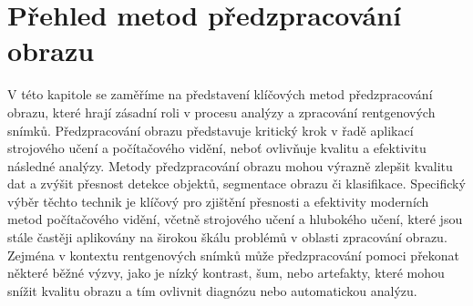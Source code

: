 \documentclass[male,czech,api_ing]{thesis}
\begin{document}
       
       
       
       
       
        
	
	


\chapter{Přehled metod předzpracování obrazu}
V této kapitole se zaměříme na představení klíčových metod předzpracování obrazu, které hrají zásadní roli v procesu analýzy a zpracování rentgenových snímků. Předzpracování obrazu představuje kritický krok v řadě aplikací strojového učení a počítačového vidění, neboť ovlivňuje kvalitu a efektivitu následné analýzy. Metody předzpracování obrazu mohou výrazně zlepšit kvalitu dat a zvýšit přesnost detekce objektů, segmentace obrazu či klasifikace. Specifický výběr těchto technik je klíčový pro zjištění přesnosti a efektivity moderních metod počítačového vidění, včetně strojového učení a hlubokého učení, které jsou stále častěji aplikovány na širokou škálu problémů v oblasti zpracování obrazu. Zejména v kontextu rentgenových snímků může předzpracování pomoci překonat některé běžné výzvy, jako je nízký kontrast, šum, nebo artefakty, které mohou snížit kvalitu obrazu a tím ovlivnit diagnózu nebo automatickou analýzu.\cite{ImportanceOfImageProcessing}
\end{document}

